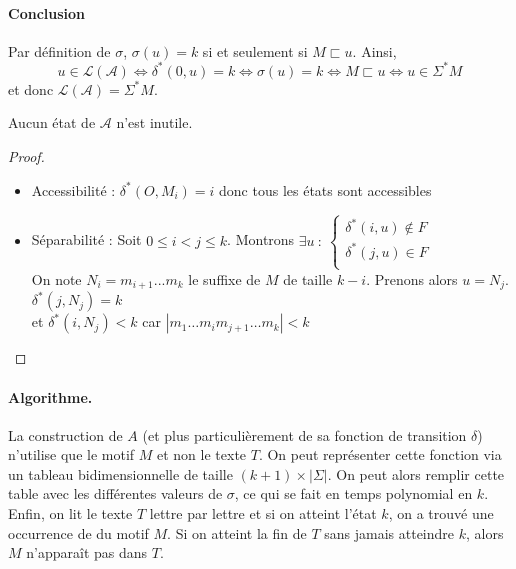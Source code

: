\paragraph{Conclusion} Par définition de $\sigma$, $\sigma(u)=k$ si et seulement si $M \sqsubset u$. Ainsi, 
$$
u\in \mathcal L(\mathcal A) \Leftrightarrow \delta^*(0,u)=k \Leftrightarrow \sigma(u)=k \Leftrightarrow M \sqsubset u \Leftrightarrow u \in \Sigma^*M
$$
et donc $\mathcal L(\mathcal A)=\Sigma^*M$.


\begin{proposition}
	Aucun état de $\mathcal A$ n'est inutile.
\end{proposition}

\begin{proof}
	
\begin{itemize}[label=$\bullet$]
	\item Accessibilité : $\delta^*(O, M_i) = i$ donc tous les états sont accessibles
	\item Séparabilité : Soit $0 \leq i < j \leq k$. Montrons $\exists u \: : \: \left\{\begin{array}{l}
		\delta^*(i,u) \notin F\\
		\delta^*(j,u) \in F\\
	\end{array}\right.$\\
	On note $N_i=m_{i+1}...m_k$ le suffixe de $M$ de taille $k-i$. Prenons alors $u = N_j$.\\
	$\delta^*(j, N_j) = k$\\
	et $\delta^*(i, N_j) < k$ \qquad car $|m_1\dots m_i m_{j+1} \dots m_k| < k$
\end{itemize}

\end{proof}


\paragraph{Algorithme.}

La construction de $A$ (et plus particulièrement de sa fonction de transition $\delta$) n'utilise que le motif $M$ et non le texte $T$. On peut représenter cette fonction via un tableau bidimensionnelle de taille $(k+1)\times |\Sigma|$. On peut alors remplir cette table avec les différentes valeurs de $\sigma$, ce qui se fait en temps polynomial en $k$. Enfin, on lit le texte $T$ lettre par lettre et si on atteint l'état $k$, on a trouvé une occurrence de du motif $M$. Si on atteint la fin de $T$ sans jamais atteindre $k$, alors $M$ n'apparaît pas dans $T$.
